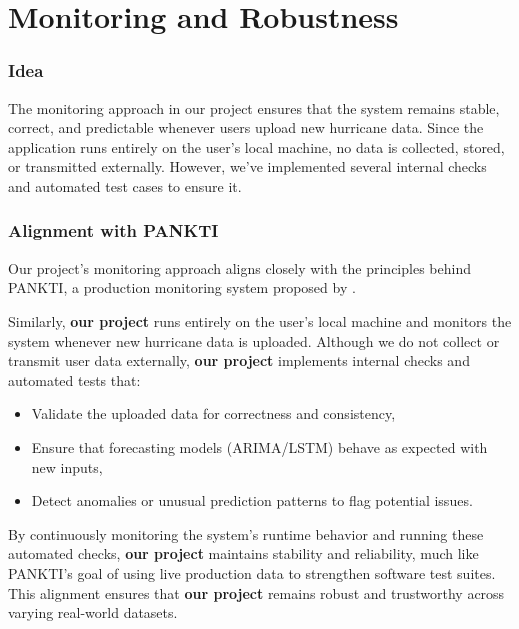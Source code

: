 
%
%
%



\chapter{Monitoring and Robustness}


\subsection{Idea}

The monitoring approach in our project ensures that the system remains stable, correct, and predictable whenever users upload new hurricane data. Since the application runs entirely on the user's local machine, no data is collected, stored, or transmitted externally. However, we've implemented several internal checks and automated test cases to ensure it.

\subsection{Alignment with PANKTI}

Our project’s monitoring approach aligns closely with the principles behind PANKTI, a production monitoring system proposed by \cite{Tiwari2021PANKTI}.



Similarly, \textbf{our project} runs entirely on the user’s local machine and monitors the system whenever new hurricane data is uploaded. Although we do not collect or transmit user data externally, \textbf{our project} implements internal checks and automated tests that:

\begin{itemize}
	\item Validate the uploaded data for correctness and consistency,
	\item Ensure that forecasting models (ARIMA/LSTM) behave as expected with new inputs,
	\item Detect anomalies or unusual prediction patterns to flag potential issues.
\end{itemize}

By continuously monitoring the system’s runtime behavior and running these automated checks, \textbf{our project} maintains stability and reliability, much like PANKTI’s goal of using live production data to strengthen software test suites. This alignment ensures that \textbf{our project} remains robust and trustworthy across varying real-world datasets.




